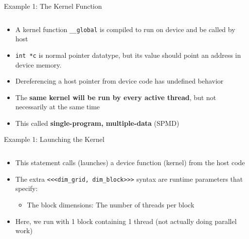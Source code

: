 \documentclass{beamer}
\begin{document}
    \begin{frame}{Example 1:  The Kernel Function}
        \begin{block}{}
            \inputminted[firstline=1,lastline=3]{cuda}{src/01_scalar_add.cu}
        \end{block}
        \begin{itemize}
            \item A kernel function \texttt{\_\_global} is compiled to run on device and be called by host
            \item \texttt{int *c} is normal pointer datatype, but its value should point an address in device memory.
            \item Dereferencing a host pointer from device code has undefined behavior
            \item The \textbf{same kernel will be run by every active thread}, but not necessarily at the same time
            \item This called \textbf{single-program, multiple-data} (SPMD)
        \end{itemize}
    \end{frame}

    \begin{frame}{Example 1: Launching the Kernel}
        \begin{block}{}
            \inputminted[firstline=11,lastline=11]{cuda}{src/01_scalar_add.cu}
        \end{block}
        \begin{itemize}
            \item This statement calls (launches) a device function (kernel) from the host code
            \item The extra \texttt{<<<dim\_grid, dim\_block>>>} syntax are runtime parameters that specify:
            \begin{itemize}
                \item The block dimensions:  The number of threads per block
            \end{itemize}
            \item Here, we run with 1 block containing 1 thread (not actually doing parallel work)
        \end{itemize}
    \end{frame}
\end{document}
